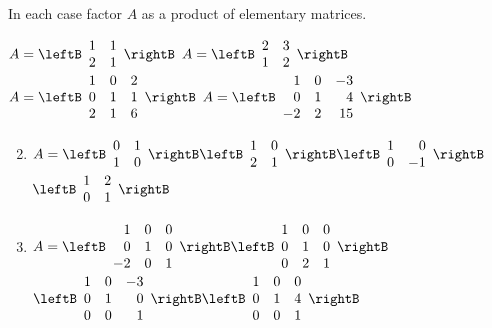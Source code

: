 \begin{multicols}{2}
\begin{ex}
In each case factor $A$ as a product of elementary matrices.
\begin{exenumerate}
\exitem $A = \leftB \begin{array}{rr}
1 & 1 \\
2 & 1
\end{array} \rightB$
\exitem $A = \leftB \begin{array}{rr}
2 & 3 \\
1 & 2
\end{array} \rightB$
\exitem $A = \leftB \begin{array}{rrr}
1 & 0 & 2 \\
0 & 1 & 1 \\
2 & 1 & 6
\end{array} \rightB$
\exitem $A = \leftB \begin{array}{rrr}
1 & 0 & -3 \\
0 & 1 & 4 \\
-2 & 2 & 15
\end{array} \rightB$
\end{exenumerate}
\begin{sol}
\begin{enumerate}[label={\alph*.}]
\setcounter{enumi}{1}
\item $A = \leftB \begin{array}{rr}
0 & 1 \\
1 & 0
\end{array} \rightB \leftB \begin{array}{rr}
1 & 0 \\
2 & 1
\end{array} \rightB \leftB \begin{array}{rr}
1 & 0 \\
0 & -1
\end{array} \rightB$ \\ $\leftB \begin{array}{rr}
1 & 2 \\
0 & 1
\end{array} \rightB$

\setcounter{enumi}{3}
\item $A = \leftB \begin{array}{rrr}
1 & 0 & 0 \\
0 & 1 & 0 \\
-2 & 0 & 1
\end{array} \rightB \leftB \begin{array}{rrr}
1 & 0 & 0 \\
0 & 1 & 0 \\
0 & 2 & 1
\end{array} \rightB$ \\ $\leftB \begin{array}{rrr}
1 & 0 & -3 \\
0 & 1 & 0 \\
0 & 0 & 1
\end{array} \rightB \leftB \begin{array}{rrr}
1 & 0 & 0 \\
0 & 1 & 4 \\
0 & 0 & 1
\end{array} \rightB$


\end{enumerate}
\end{sol}
\end{ex}
\end{multicols}
